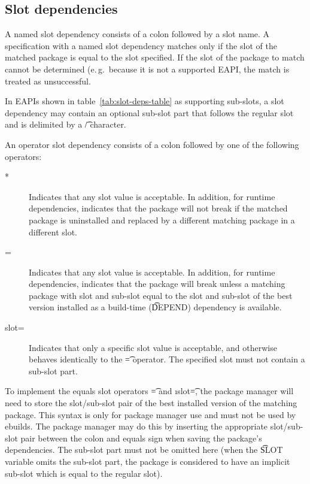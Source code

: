 \subsection{Slot dependencies}
\label{sec:slot-dep}

 A named slot dependency consists of a colon followed by a slot name. A
specification with a named slot dependency matches only if the slot of the matched package is equal
to the slot specified. If the slot of the package to match cannot be determined (e.\,g.\ because it
is not a supported EAPI, the match is treated as unsuccessful.

 In EAPIs shown in table~\ref{tab:slot-deps-table} as supporting sub-slots,
a slot dependency may contain an optional sub-slot part that follows the regular slot and is
delimited by a \t{/} character.

 An operator slot dependency consists of a colon followed by one of
the following operators:
\nobreakpar
\begin{description}
\item[*] Indicates that any slot value is acceptable. In addition, for runtime dependencies,
    indicates that the package will not break if the matched package is uninstalled and replaced by
    a different matching package in a different slot.
\item[=] Indicates that any slot value is acceptable. In addition, for runtime dependencies,
    indicates that the package will break unless a matching package with slot and sub-slot equal to
    the slot and sub-slot of the best version installed as a build-time (\t{DEPEND}) dependency is
    available.
\item[slot=] Indicates that only a specific slot value is acceptable, and otherwise behaves
    identically to the \t{=} operator. The specified slot must not contain a sub-slot part.
\end{description}

To implement the equals slot operators \t{=} and \i{slot}\t{=}, the package manager will need to
store the slot/sub-slot pair of the best installed version of the matching package. This syntax is
only for package manager use and must not be used by ebuilds. The package manager may do this by
inserting the appropriate slot/sub-slot pair between the colon and equals sign when saving the
package's dependencies. The sub-slot part must not be omitted here (when the \t{SLOT} variable
omits the sub-slot part, the package is considered to have an implicit sub-slot which is equal to
the regular slot).

